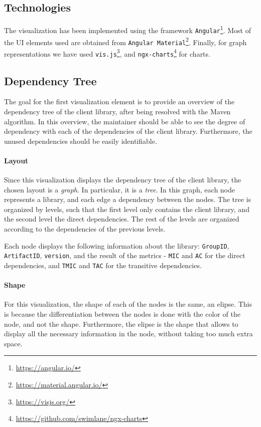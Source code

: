 \subsection{Technologies}
The visualization has been implemented using the framework \texttt{Angular}\footnote{\url{https://angular.io/}}. Most of the UI elements used are obtained from \texttt{Angular Material}\footnote{\url{https://material.angular.io/}}. Finally, for graph representations we have used \texttt{vis.js}\footnote{\url{https://visjs.org/}}, and \texttt{ngx-charts}\footnote{\url{https://github.com/swimlane/ngx-charts}} for charts.

\subsection{Dependency Tree}\label{sec:visualization-dependency-tree}
The goal for the first visualization element is to provide an overview of the dependency tree of the client library, after being resolved with the Maven algorithm. In this overview, the maintainer should be able to see the degree of dependency with each of the dependencies of the client library. Furthermore, the unused dependencies should be easily identifiable. %

\paragraph{Layout}
Since this visualization displays the dependency tree of the client library, the chosen layout is a \textit{graph}. In particular, it is a \textit{tree}. In this graph, each node represents a library, and each edge a dependency between the nodes. The tree is organized by levels, such that the first level only contains the client library, and the second level the direct dependencies. The rest of the levels are organized according to the dependencies of the previous levels.

Each node displays the following information about the library: \texttt{GroupID}, \texttt{ArtifactID}, \texttt{version}, and the result of the metrics - \texttt{MIC} and \texttt{AC} for the direct dependencies, and \texttt{TMIC} and \texttt{TAC} for the transitive dependencies.

\paragraph{Shape}
For this visualization, the shape of each of the nodes is the same, an elipse. This is because the differentiation between the nodes is done with the color of the node, and not the shape. Furthermore, the elipse is the shape that allows to display all the necessary information in the node, without taking too much extra space.


